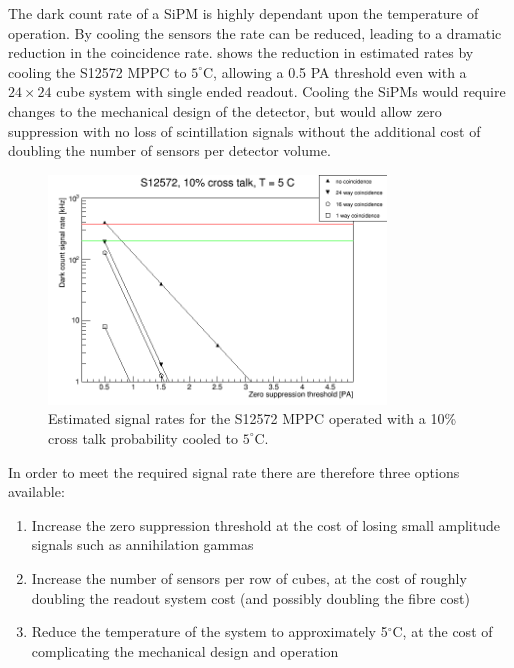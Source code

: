 \documentclass[a4paper]{article}
\begin{document}
The dark count rate of a SiPM is highly dependant upon the temperature of operation.
By cooling the sensors the rate can be reduced, leading to a dramatic reduction in the coincidence rate.
 shows the reduction in estimated rates by cooling the S12572 MPPC to $5^{\circ}$C, allowing a 0.5 PA threshold even with a $24\times24$ cube system with single ended readout.
Cooling the SiPMs would require changes to the mechanical design of the detector, but would allow zero suppression with no loss of scintillation signals without the additional cost of doubling the number of sensors per detector volume.

\begin{figure}[htp]
    \begin{center}
        \includegraphics[width=0.8\textwidth]{imgs/g_s12572_10pct_5C}
        \caption{Estimated signal rates for the S12572 MPPC operated with a 10\% cross talk probability cooled to $5^{\circ}$C.}
        \label{rates_s12572_10pct_5C}
    \end{center}
\end{figure}

In order to meet the required signal rate there are therefore three options available:
\begin{enumerate}
    \item Increase the zero suppression threshold at the cost of losing small amplitude signals such as annihilation gammas
    \item Increase the number of sensors per row of cubes, at the cost of roughly doubling the readout system cost (and possibly doubling the fibre cost)
    \item Reduce the temperature of the system to approximately 5$^{\circ}$C, at the cost of complicating the mechanical design and operation
\end{enumerate}
\end{document}
